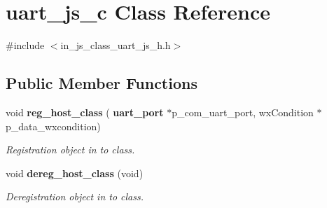 \section{uart\+\_\+js\+\_\+c Class Reference}
\label{classuart__js__c}


{\ttfamily \#include $<$in\+\_\+js\+\_\+class\+\_\+uart\+\_\+js\+\_\+h.\+h$>$}

\subsection*{Public Member Functions}
\begin{DoxyCompactItemize}
\item 
void \textbf{ reg\+\_\+host\+\_\+class} (\textbf{ uart\+\_\+port} $\ast$p\+\_\+com\+\_\+uart\+\_\+port, wx\+Condition $\ast$p\+\_\+data\+\_\+wxcondition)
\begin{DoxyCompactList}\small\item\em Registration object in to class. \end{DoxyCompactList}\item 
void \textbf{ dereg\+\_\+host\+\_\+class} (void)
\begin{DoxyCompactList}\small\item\em Deregistration object in to class. \end{DoxyCompactList}\end{DoxyCompactItemize}
